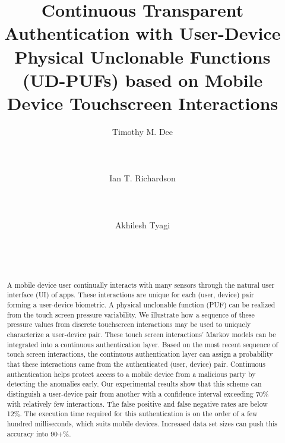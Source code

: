 \documentclass{acm_proc_article-sp}
\title{Continuous Transparent Authentication with User-Device Physical Unclonable Functions (UD-PUFs) based on Mobile Device Touchscreen Interactions}
\author{
\alignauthor Timothy M. Dee\\
      \affaddr{Electrical \& Computer Engineering}\\
      \affaddr{Iowa State University}\\
      \affaddr{Ames, IA, USA}\\
      \email{timdee@giastate.edu}
\alignauthor Ian T. Richardson\\
     \affaddr{Electrical \& Computer Engineering}\\
     \affaddr{Iowa State University}\\
     \affaddr{Ames, IA, USA}\\
     \email{ian.t.rich@gmail.com}
\alignauthor Akhilesh Tyagi\\
     \affaddr{Electrical \& Computer Engineering}\\
     \affaddr{Iowa State University}\\
      \affaddr{Ames, IA, USA}\\
      \email{tyagi@iastate.edu}
}
\begin{document}
\maketitle
\begin{abstract}
A mobile device user continually interacts with many sensors through the natural
user interface (UI) of apps. 
These interactions are unique for each (user, device) pair
forming a user-device biometric.  
%
A physical unclonable function (PUF) can be realized
from the touch screen pressure variability.
%
We illustrate how a sequence of these pressure values 
from discrete touchscreen interactions 
may be used to uniquely characterize a user-device pair.
%
These touch screen interactions' Markov models can be integrated into a
continuous authentication layer.
%
Based on the most recent sequence of touch screen interactions,
the continuous authentication layer can assign a probability that these
interactions came from the authenticated (user, device) pair.
%
Continuous authentication helps protect access to a mobile device
from a malicious party by detecting the anomalies early.
%
Our experimental results show that this scheme can distinguish a user-device
pair from another with a confidence interval exceeding 70\%
with relatively few interactions. 
The false positive and false negative rates are below 12\%.
%
The execution time required for this authentication is 
on the order of a few hundred milliseconds, which suits mobile devices.
%
Increased data set sizes can push this accuracy into 90+\%.
\end{abstract}



\end{document}
